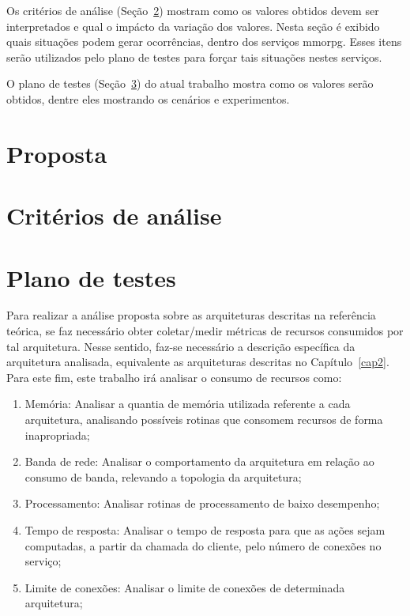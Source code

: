 Os critérios de análise (Seção~\ref{sec:criterios}) mostram como os valores obtidos devem ser interpretados e qual o impácto da variação dos valores.
%
Nesta seção é exibido quais situações podem gerar ocorrências, dentro dos serviços \ac{mmorpg}.
%
Esses itens serão utilizados pelo plano de testes para forçar tais situações nestes serviços.


O plano de testes (Seção~\ref{sec:plano}) do atual trabalho mostra como os valores serão obtidos, dentre eles mostrando os cenários e experimentos.

\section{Proposta}
\label{sec:proposta}


\section{Critérios de análise}
\label{sec:criterios}


\section {Plano de testes}
\label{sec:plano}


Para realizar a análise proposta sobre as arquiteturas descritas na referência teórica, se faz necessário obter coletar/medir métricas de recursos consumidos por tal arquitetura.
%
Nesse sentido, faz-se necessário a descrição específica da arquitetura analisada, equivalente as arquiteturas descritas no Capítulo~\ref{cap2}.
%
Para este fim, este trabalho irá analisar o consumo de recursos como:

\begin{enumerate}
  \item{Memória: Analisar a quantia de memória utilizada referente a cada arquitetura, analisando possíveis rotinas que consomem recursos de forma inapropriada;}
  \item{Banda de rede: Analisar o comportamento da arquitetura em relação ao consumo de banda, relevando a topologia da arquitetura;}
  \item{Processamento: Analisar rotinas de processamento de baixo desempenho;}
  \item{Tempo de resposta: Analisar o tempo de resposta para que as ações sejam computadas, a partir da chamada do cliente, pelo número de conexões no serviço;}
  \item{Limite de conexões: Analisar o limite de conexões de determinada arquitetura;}
\end{enumerate}

